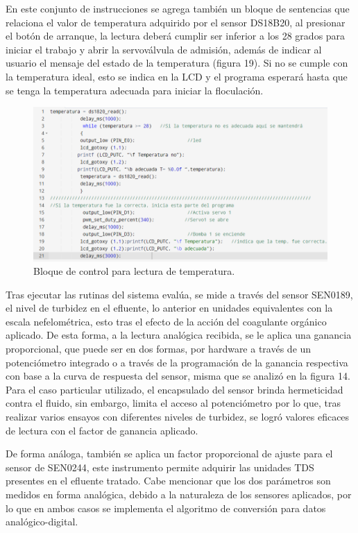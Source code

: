 \documentclass[conference]{IEEEtran}
\begin{document}
En este conjunto de instrucciones se agrega también un bloque de sentencias que relaciona el valor de temperatura adquirido por el sensor DS18B20, al presionar el botón de arranque, la lectura deberá cumplir ser inferior a los 28 grados para iniciar el trabajo y abrir la servoválvula de admisión, además de indicar al usuario el mensaje del estado de la temperatura (figura 19). Si no se cumple con la temperatura ideal, esto se indica en la LCD y el programa esperará hasta que se tenga la temperatura adecuada para iniciar la floculación.

\begin{figure}[htbp]
	\centering
	\includegraphics[width=0.9\columnwidth]{fig19.png}
	\caption{Bloque de control para lectura de temperatura.}
	\label{fig:sensor-ph-temperatura}
\end{figure}

Tras ejecutar las rutinas del sistema evalúa, se mide a través del sensor SEN0189, el nivel de turbidez en el efluente, lo anterior en unidades equivalentes con la escala nefelométrica, esto tras el efecto de la acción del coagulante orgánico aplicado. De esta forma, a la lectura analógica recibida, se le aplica una ganancia proporcional, que puede ser en dos formas, por hardware a través de un potenciómetro integrado o a través de la programación de la ganancia respectiva con base a la curva de respuesta del sensor, misma que se analizó en la figura 14. Para el caso particular utilizado, el encapsulado del sensor brinda hermeticidad contra el fluido, sin embargo, limita el acceso al potenciómetro por lo que, tras realizar varios ensayos con diferentes niveles de turbidez, se logró valores eficaces de lectura con el factor de ganancia aplicado.

De forma análoga, también se aplica un factor proporcional de ajuste para el sensor de SEN0244, este instrumento permite adquirir las unidades TDS presentes en el efluente tratado. Cabe mencionar que los dos parámetros son medidos en forma analógica, debido a la naturaleza de los sensores aplicados, por lo que en ambos casos se implementa el algoritmo de conversión para datos analógico-digital.
\end{document}
